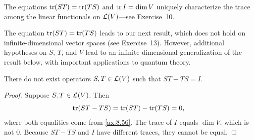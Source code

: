 The equations $\operatorname{tr}(ST)=\operatorname{tr}(TS)$ and $\operatorname{tr} I=\operatorname{dim} V$ uniquely characterize the
trace among the linear functionals on $\mathcal{L}(V)$---see Exercise~10.

%
The equation $\operatorname{tr}(ST)=\operatorname{tr}(TS)$ leads to our next result, which does not hold on
infinite-dimensional vector spaces (see Exercise~13). However, additional
hypotheses on $S$, $T$, and $V$ lead to an infinite-dimensional generalization
of the result below, with important applications to quantum theory.

\begin{result}\label{ax:8.57}
There do not exist operators $S,T\in\mathcal{L}(V)$ such that $ST-TS=I$.
\end{result}

\begin{proof}
Suppose $S,T\in\mathcal{L}(V)$. Then
\[ \operatorname{tr}(ST-TS) = \operatorname{tr}(ST) - \operatorname{tr}(TS) = 0, \]
where both equalities come from \ref{ax:8.56}. The trace of $I$ equals
$\dim V$, which is not $0$. Because $ST-TS$ and $I$ have different traces, they
cannot be equal.
\end{proof}

